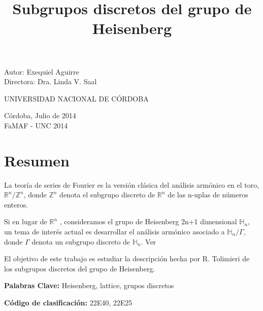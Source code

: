 \documentclass[12pt]{article}
\author{}
\title{\Huge{Subgrupos discretos del grupo de Heisenberg} }
\date{}
\begin{document}
\maketitle
\vspace{100px}
\thispagestyle{empty}
\begin{center}
\begin{large}
Autor: Exequiel Aguirre \\ 
Directora: Dra. Linda V. Saal\\
\end{large}
\vspace{100px}

UNIVERSIDAD NACIONAL DE CÓRDOBA\\

\vspace{25px}


Córdoba, Julio de 2014\\
FaMAF - UNC 2014\\

\end{center}

\clearpage
\newpage\null\thispagestyle{empty}\newpage


\section*{Resumen}
La teoría de series de Fourier es la versión clásica del análisis armónico en el toro,
$\mathbb{R}^n /\mathbb{Z}^n$, donde $\mathbb{Z}^n$ denota el subgrupo discreto de $\mathbb{R}^n$ de
las n-uplas de números enteros.

Si en lugar de $\mathbb{R}^n$ , consideramos el grupo de Heisenberg 2n+1 dimensional $\mathbb{H}_n$, un tema
de interés actual es desarrollar el análisis armónico asociado a $\mathbb{H}_n/\Gamma$, donde $\Gamma$ 
denota un subgrupo discreto de $\mathbb{H}_n$. Ver \cite{Th} 

El objetivo de este trabajo es estudiar la descripción hecha por R. Tolimieri \cite{To} de los subgrupos discretos
del grupo de Heisenberg.

\bigskip\bigskip\bigskip
\textbf{Palabras Clave:} Heisenberg, lattice, grupos discretos

\bigskip
\textbf{Código de clasificación:} 22E40, 22E25



\clearpage
\tableofcontents
\clearpage
\end{document}
